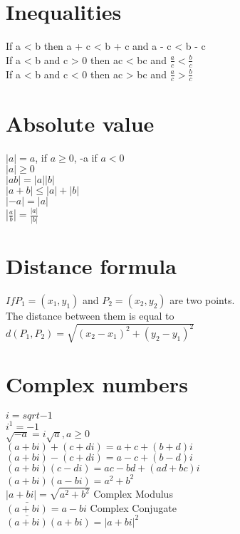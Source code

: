 \documentclass[10pt,onecolumn]{article}
\begin{document}
{%
\section{Inequalities}
If a < b then a + c < b + c and a - c < b - c \\
If a < b and c > 0 then ac < bc and \(\frac{a}{c} < \frac{b}{c}\) \\
If a < b and c < 0 then ac > bc and \(\frac{a}{c} > \frac{b}{c}\) \\

\section{Absolute value}
\(\left|a\right| = a \), if \(a \ge 0\), -a if \(a < 0\) \\
\(\left|a\right| \ge 0 \) \\
\(\left|ab\right| = \left|a\right|\left|b\right| \) \\
\(\left|a+b\right| \le \left|a\right| + \left|b\right|\) \\
\(\left|-a\right| = \left|a\right| \) \\
\(\left|\frac{a}{b}\right| = \frac{\left|a\right|}{\left|b\right|} \) \\


\section{Distance formula}
\(If P_1 = (x_1, y_1) \) and \(P_2 = (x_2, y_2)\) are two points. \\
The distance between them is equal to \\
\(d(P_1, P_2) = \sqrt{(x_2 - x_1)^2 + (y_2 - y_1)^2} \)

\section{Complex numbers}
\(i = sqrt{-1} \) \\
\(i^1 = -1 \) \\
\(\sqrt{-a} = i\sqrt{a}, a \ge 0 \) \\
\((a + bi) + (c + di) = a+ c + (b + d)i\) \\
\((a + bi) - (c + di) = a - c + (b - d)i \) \\
\((a + bi)(c - di) = ac - bd + (ad + bc)i\) \\
\((a + bi)(a - bi) = a^2 + b^2 \) \\
\(\left|a + bi\right| = \sqrt{a^2 + b^2} \) Complex Modulus \\
\(\bar{(a + bi)} = a - bi \) Complex Conjugate  \\
\(\bar{(a + bi)}(a + bi) = \left|a + bi\right|^2 \)

}
\end{document}

